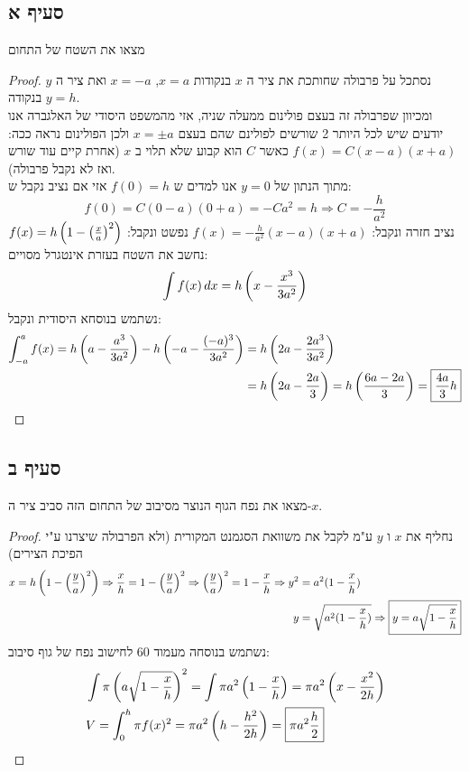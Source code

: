 \documentclass{article}
\begin{document}
	\subsection*{סעיף א}
	מצאו את השטח של התחום
	\begin{proof}
		נסתכל על פרבולה שחותכת את ציר ה $x$ בנקודות $x = a$, $x = -a$ ואת ציר ה $y$ בנקודה $y = h$. \\
		ומכיוון שפרבולה זה בעצם פולינום ממעלה שניה, אזי מהמשפט היסודי של האלגברה אנו יודעים שיש לכל היותר 2 שורשים לפולינם שהם בעצם $x = \pm a$
		ולכן הפולינום נראה ככה: $f(x) = C(x - a)(x + a)$ כאשר $C$ הוא קבוע שלא תלוי ב $x$ (אחרת קיים עוד שורש ואז לא נקבל פרבולה). \\
		מתוך הנתון של $y = 0$ אנו למדים ש $f(0) = h$ אזי אם נציב נקבל ש:
		\[
		f(0) = C(0 - a)(0 + a)
		= -Ca^2 = h \Rightarrow
		C = - \frac{h}{a^2}
		\]
		נציב חזרה ונקבל: $f(x) = -\frac{h}{a^2}(x - a)(x + a)$ נפשט ונקבל: $f(x) = h\left( 1 - \left( \frac{x}{a} \right)^2 \right)$ נחשב את השטח בעזרת אינטגרל מסויים:
		\[
		\int f(x) \, dx = h\left( x - \frac{x^3}{3a^2} \right)
		\]
		נשתמש בנוסחא היסודית ונקבל:
		\begin{align*}
		\int_{-a}^a f(x) =
		h\left( a - \frac{a^3}{3a^2} \right) - h\left( -a - \frac{(-a)^3}{3a^2} \right)
		&= h \left( 2a - \frac{2a^3}{3a^2} \right) \\
		&= h \left( 2a - \frac{2a}{3} \right)
		= h \left( \frac{6a - 2a}{3} \right)
		= \boxed{\frac{4a}{3}h}
	\end{align*}
	\end{proof}

	\subsection*{סעיף ב}
	מצאו את נפח הגוף הנוצר מסיבוב של התחום הזה סביב ציר ה-$x$.
	\begin{proof}
		נחליף את $x$ ו $y$ ע"מ לקבל את משוואת הסגמנט המקורית (ולא הפרבולה שיצרנו ע"י הפיכת הצירים)
		\begin{align*}
			x = h\left( 1 - \left( \frac{y}{a} \right)^2 \right) \Rightarrow
			\frac{x}{h} = 1 - \left( \frac{y}{a} \right)^2 \Rightarrow
			\left( \frac{y}{a} \right)^2 = 1 - \frac{x}{h} \Rightarrow
			y^2 &= a^2(1 - \frac{x}{h}) \\
			y &= \sqrt{a^2(1 - \frac{x}{h})} \Rightarrow
			\boxed{y = a\sqrt{1 - \frac{x}{h}}}
		\end{align*}
		נשתמש בנוסחה מעמוד 60 לחישוב נפח של גוף סיבוב:
		\begin{align*}
			&\int \pi \left( a\sqrt{1 - \frac{x}{h}} \right)^2
			= \int \pi a^2 \left( 1 - \frac{x}{h} \right)
			= \pi a^2 \left( x - \frac{x^2}{2h} \right) \\
			&V = \int^h_0 \pi f(x)^2
			= \pi a^2 \left( h - \frac{h^2}{2h} \right)
			= \boxed{\pi a^2 \frac{h}{2}}
		\end{align*}
	\end{proof}
\end{document}
